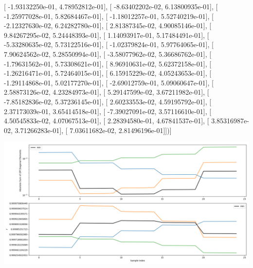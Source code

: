 \documentclass{article}
\begin{document}
       [ -1.93132250e-01,   4.78952812e-01],
       [ -8.63402202e-02,   6.13800935e-01],
       [ -1.25977028e-01,   5.82684467e-01],
       [ -1.18012257e-01,   5.52740219e-01],
       [ -2.12327630e-02,   6.24282780e-01],
       [  2.81387345e-02,   4.90085146e-01],
       [  9.84267295e-02,   5.24448393e-01],
       [  1.14093917e-01,   5.17484491e-01],
       [ -5.33280635e-02,   5.73122516e-01],
       [ -1.02379824e-01,   5.97764065e-01],
       [  7.90624562e-02,   5.28550994e-01],
       [ -3.58077962e-02,   5.36686762e-01],
       [ -1.79631562e-01,   5.73308621e-01],
       [  8.96910631e-02,   5.62372158e-01],
       [ -1.26216471e-01,   5.72464015e-01],
       [  6.15915229e-02,   4.05243653e-01],
       [ -1.29114868e-01,   5.02177270e-01],
       [ -2.69012759e-01,   5.09060647e-01],
       [  2.58873126e-02,   4.23284973e-01],
       [  5.29147599e-02,   3.67211982e-01],
       [ -7.85182836e-02,   5.37236145e-01],
       [  2.60233553e-02,   4.59195792e-01],
       [  2.37173039e-01,   3.65414518e-01],
       [ -7.39027091e-02,   3.57116610e-01],
       [  4.50545833e-02,   4.07067513e-01],
       [  2.28394580e-01,   4.67841537e-01],
       [  3.85316987e-02,   3.71266283e-01],
       [  7.03611682e-02,   2.81496196e-01]])]
\begin{center}
\includegraphics[scale=.9]{report_pickled_controls185/control_dpn_all.png}

\end{center}
\end{document}
